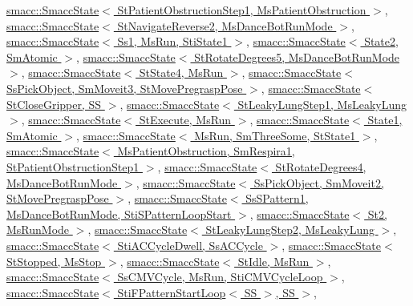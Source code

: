 \hyperlink{classsmacc_1_1SmaccState_afc39f8e0ca4001b2159a100da2fccd0e}{smacc\+::\+Smacc\+State$<$ St\+Patient\+Obstruction\+Step1, Ms\+Patient\+Obstruction $>$}, \hyperlink{classsmacc_1_1SmaccState_afc39f8e0ca4001b2159a100da2fccd0e}{smacc\+::\+Smacc\+State$<$ St\+Navigate\+Reverse2, Ms\+Dance\+Bot\+Run\+Mode $>$}, \hyperlink{classsmacc_1_1SmaccState_afc39f8e0ca4001b2159a100da2fccd0e}{smacc\+::\+Smacc\+State$<$ Ss1, Ms\+Run, Sti\+State1 $>$}, \hyperlink{classsmacc_1_1SmaccState_afc39f8e0ca4001b2159a100da2fccd0e}{smacc\+::\+Smacc\+State$<$ State2, Sm\+Atomic $>$}, \hyperlink{classsmacc_1_1SmaccState_afc39f8e0ca4001b2159a100da2fccd0e}{smacc\+::\+Smacc\+State$<$ St\+Rotate\+Degrees5, Ms\+Dance\+Bot\+Run\+Mode $>$}, \hyperlink{classsmacc_1_1SmaccState_afc39f8e0ca4001b2159a100da2fccd0e}{smacc\+::\+Smacc\+State$<$ St\+State4, Ms\+Run $>$}, \hyperlink{classsmacc_1_1SmaccState_afc39f8e0ca4001b2159a100da2fccd0e}{smacc\+::\+Smacc\+State$<$ Ss\+Pick\+Object, Sm\+Moveit3, St\+Move\+Pregrasp\+Pose $>$}, \hyperlink{classsmacc_1_1SmaccState_afc39f8e0ca4001b2159a100da2fccd0e}{smacc\+::\+Smacc\+State$<$ St\+Close\+Gripper, S\+S $>$}, \hyperlink{classsmacc_1_1SmaccState_afc39f8e0ca4001b2159a100da2fccd0e}{smacc\+::\+Smacc\+State$<$ St\+Leaky\+Lung\+Step1, Ms\+Leaky\+Lung $>$}, \hyperlink{classsmacc_1_1SmaccState_afc39f8e0ca4001b2159a100da2fccd0e}{smacc\+::\+Smacc\+State$<$ St\+Execute, Ms\+Run $>$}, \hyperlink{classsmacc_1_1SmaccState_afc39f8e0ca4001b2159a100da2fccd0e}{smacc\+::\+Smacc\+State$<$ State1, Sm\+Atomic $>$}, \hyperlink{classsmacc_1_1SmaccState_afc39f8e0ca4001b2159a100da2fccd0e}{smacc\+::\+Smacc\+State$<$ Ms\+Run, Sm\+Three\+Some, St\+State1 $>$}, \hyperlink{classsmacc_1_1SmaccState_afc39f8e0ca4001b2159a100da2fccd0e}{smacc\+::\+Smacc\+State$<$ Ms\+Patient\+Obstruction, Sm\+Respira1, St\+Patient\+Obstruction\+Step1 $>$}, \hyperlink{classsmacc_1_1SmaccState_afc39f8e0ca4001b2159a100da2fccd0e}{smacc\+::\+Smacc\+State$<$ St\+Rotate\+Degrees4, Ms\+Dance\+Bot\+Run\+Mode $>$}, \hyperlink{classsmacc_1_1SmaccState_afc39f8e0ca4001b2159a100da2fccd0e}{smacc\+::\+Smacc\+State$<$ Ss\+Pick\+Object, Sm\+Moveit2, St\+Move\+Pregrasp\+Pose $>$}, \hyperlink{classsmacc_1_1SmaccState_afc39f8e0ca4001b2159a100da2fccd0e}{smacc\+::\+Smacc\+State$<$ Ss\+S\+Pattern1, Ms\+Dance\+Bot\+Run\+Mode, Sti\+S\+Pattern\+Loop\+Start $>$}, \hyperlink{classsmacc_1_1SmaccState_afc39f8e0ca4001b2159a100da2fccd0e}{smacc\+::\+Smacc\+State$<$ St2, Ms\+Run\+Mode $>$}, \hyperlink{classsmacc_1_1SmaccState_afc39f8e0ca4001b2159a100da2fccd0e}{smacc\+::\+Smacc\+State$<$ St\+Leaky\+Lung\+Step2, Ms\+Leaky\+Lung $>$}, \hyperlink{classsmacc_1_1SmaccState_afc39f8e0ca4001b2159a100da2fccd0e}{smacc\+::\+Smacc\+State$<$ Sti\+A\+C\+Cycle\+Dwell, Ss\+A\+C\+Cycle $>$}, \hyperlink{classsmacc_1_1SmaccState_afc39f8e0ca4001b2159a100da2fccd0e}{smacc\+::\+Smacc\+State$<$ St\+Stopped, Ms\+Stop $>$}, \hyperlink{classsmacc_1_1SmaccState_afc39f8e0ca4001b2159a100da2fccd0e}{smacc\+::\+Smacc\+State$<$ St\+Idle, Ms\+Run $>$}, \hyperlink{classsmacc_1_1SmaccState_afc39f8e0ca4001b2159a100da2fccd0e}{smacc\+::\+Smacc\+State$<$ Ss\+C\+M\+V\+Cycle, Ms\+Run, Sti\+C\+M\+V\+Cycle\+Loop $>$}, \hyperlink{classsmacc_1_1SmaccState_afc39f8e0ca4001b2159a100da2fccd0e}{smacc\+::\+Smacc\+State$<$ Sti\+F\+Pattern\+Start\+Loop$<$ S\+S $>$, S\+S $>$}, 